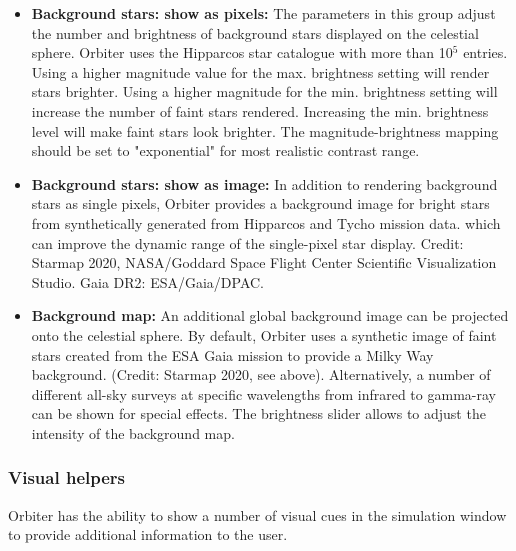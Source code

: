 \documentclass[Orbiter User Manual.tex]{subfiles}
\begin{document}
\noindent
{}

\begin{itemize}
\item \textbf{Background stars: show as pixels:} The parameters in this group adjust the number and brightness of background stars displayed on the celestial sphere. Orbiter uses the Hipparcos star catalogue with more than 10$^{5}$ entries.\\
Using a higher magnitude value for the max. brightness setting will render stars brighter. Using a higher magnitude for the min. brightness setting will increase the number of faint stars rendered. Increasing the min. brightness level will make faint stars look brighter. The magnitude-brightness mapping should be set to "exponential" for most realistic contrast range.
\item \textbf{Background stars: show as image:} In addition to rendering background stars as single pixels, Orbiter provides a background image for bright stars from synthetically generated from Hipparcos and Tycho mission data. which can improve the dynamic range of the single-pixel star display. Credit: Starmap 2020, NASA/Goddard Space Flight Center Scientific Visualization Studio. Gaia DR2: ESA/Gaia/DPAC.
\item \textbf{Background map:} An additional global background image can be projected onto the celestial sphere. By default, Orbiter uses a synthetic image of faint stars created from the ESA Gaia mission to provide a Milky Way background. (Credit: Starmap 2020, see above). Alternatively, a number of different all-sky surveys at specific wavelengths from infrared to gamma-ray can be shown for special effects. The brightness slider allows to adjust the intensity of the background map.
\end{itemize}


\subsubsection{Visual helpers}
Orbiter has the ability to show a number of visual cues in the simulation window to provide additional information to the user.
\end{document}
